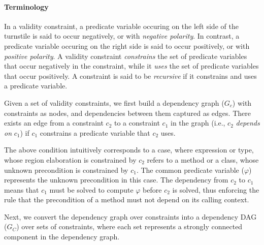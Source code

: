 \paragraph{Terminology} In a validity constraint, a predicate variable
occuring on the left side of the turnstile is said to occur
negatively, or with \emph{negative polarity}. In contrast, a predicate
variable occuring on the right side is said to occur positively, or
with \emph{positive polarity}. A validity constraint
\emph{constrains} the set of predicate variables that occur
negatively in the constraint, while it \emph{uses} the set of
predicate variables that occur positively. A constraint is said to be
\emph{recursive} if it constrains and uses a predicate variable.

Given a set of validity constraints, we first build a dependency graph
($G_c$) with constraints as nodes, and dependencies between them
captured as edges. There exists an edge from a constraint $c_2$ to a
constraint $c_1$ in the graph (i.e., $c_2$ \emph{depends on} $c_1$) if
$c_1$ constrains a predicate variable that $c_2$ uses. 

The above condition intuitively corresponds to a case, where
expression or type, whose region elaboration is constrained by $c_2$
refers to a method or a class, whose unknown precondition is
constrained by $c_1$. The common predicate variable ($\varphi$)
represents the unknown precondition in this case. The dependency from
$c_2$ to $c_1$ means that $c_1$ must be solved to compute $\varphi$
before $c_2$ is solved, thus enforcing the rule that the precondition
of a method must not depend on its calling context. 

Next, we convert the dependency graph over constraints into a
dependency DAG ($G_C$) over sets of constraints, where each set
represents a strongly connected component in the dependency graph.

